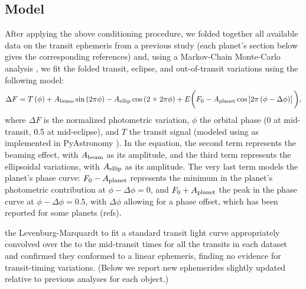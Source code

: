 \documentclass[manuscript]{aastex}
\begin{document}
\subsection{Model}

After applying the above conditioning procedure, we folded together all available data on the transit ephemeris from a previous study (each planet's section below gives the corresponding references) and, using a Markov-Chain Monte-Carlo analysis \citep{}, we fit the folded transit, eclipse, and out-of-transit variations using the following model:
\begin{equation}
    \Delta F = T\left(\phi\right) + A_{\rm beam} \sin\left(2\pi\phi\right) - A_{\rm ellip} \cos\left( 2 \times 2\pi\phi \right) + E \bigg( F_{\rm 0} - A_{\rm planet} \cos\left[ 2\pi\left( \phi - \Delta \phi \right) \right] \bigg), \label{eqn:photometric_model}
\end{equation}
where $\Delta F$ is the normalized photometric variation, $\phi$ the orbital phase (0 at mid-transit, 0.5 at mid-eclipse), and $T$ the transit signal (modeled using \citealt{} as implemented in PyAstronomy \citealt{}). In the equation, the second term represents the beaming effect, with $A_{\rm beam}$ as its amplitude, and the third term represents the ellipsoidal variations, with $A_{\rm ellip}$ as its amplitude. The very last term models the planet's phase curve: $F_{\rm 0} - A_{\rm planet}$ represents the minimum in the planet's photometric contribution at $\phi - \Delta \phi = 0$, and $F_{\rm 0} + A_{\rm planet}$ the peak in the phase curve at $\phi - \Delta \phi = 0.5$, with $\Delta \phi$ allowing for a phase offset, which has been reported for some planets (refs).

the Levenburg-Marquardt to fit a standard transit light curve \citep{2002ApJ...580L.171M} appropriately convolved over the to the mid-transit times for all the transits in each dataset and confirmed they conformed to a linear ephemeris, finding no evidence for transit-timing variations. (Below we report new ephemerides slightly updated relative to previous analyses for each object.) 
\end{document}
